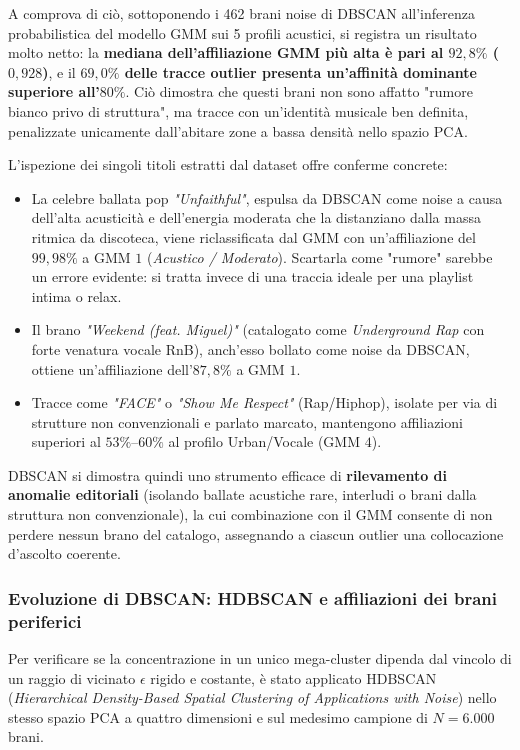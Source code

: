 A comprova di ciò, sottoponendo i 462 brani noise di DBSCAN all'inferenza probabilistica del modello GMM sui 5 profili acustici, si registra un risultato molto netto: la \textbf{mediana dell'affiliazione GMM più alta è pari al $92,8\%$ ($0,928$)}, e il \textbf{$69,0\%$ delle tracce outlier presenta un'affinità dominante superiore all'$80\%$}. Ciò dimostra che questi brani non sono affatto "rumore bianco privo di struttura", ma tracce con un'identità musicale ben definita, penalizzate unicamente dall'abitare zone a bassa densità nello spazio PCA.

L'ispezione dei singoli titoli estratti dal dataset offre conferme concrete:
\begin{itemize}
    \item La celebre ballata pop \textit{"Unfaithful"}, espulsa da DBSCAN come noise a causa dell'alta acusticità e dell'energia moderata che la distanziano dalla massa ritmica da discoteca, viene riclassificata dal GMM con un'affiliazione del \textbf{$99,98\%$} a $\text{GMM } 1$ (\textit{Acustico / Moderato}). Scartarla come "rumore" sarebbe un errore evidente: si tratta invece di una traccia ideale per una playlist intima o relax.
    \item Il brano \textit{"Weekend (feat. Miguel)"} (catalogato come \textit{Underground Rap} con forte venatura vocale RnB), anch'esso bollato come noise da DBSCAN, ottiene un'affiliazione dell'\textbf{$87,8\%$} a $\text{GMM } 1$.
    \item Tracce come \textit{"FACE"} o \textit{"Show Me Respect"} (Rap/Hiphop), isolate per via di strutture non convenzionali e parlato marcato, mantengono affiliazioni superiori al $53\%\text{--}60\%$ al profilo Urban/Vocale ($\text{GMM } 4$).
\end{itemize}
DBSCAN si dimostra quindi uno strumento efficace di \textbf{rilevamento di anomalie editoriali} (isolando ballate acustiche rare, interludi o brani dalla struttura non convenzionale), la cui combinazione con il GMM consente di non perdere nessun brano del catalogo, assegnando a ciascun outlier una collocazione d'ascolto coerente.

\subsubsection{Evoluzione di DBSCAN: HDBSCAN e affiliazioni dei brani periferici}
Per verificare se la concentrazione in un unico mega-cluster dipenda dal vincolo di un raggio di vicinato $\epsilon$ rigido e costante, è stato applicato HDBSCAN (\textit{Hierarchical Density-Based Spatial Clustering of Applications with Noise}) nello stesso spazio PCA a quattro dimensioni e sul medesimo campione di $N=6.000$ brani. 

